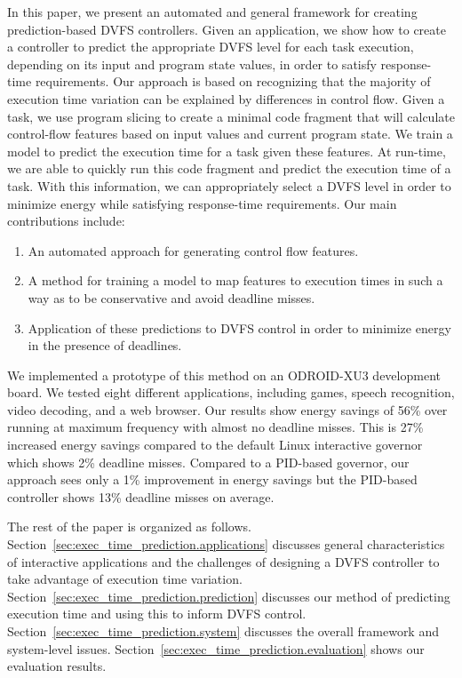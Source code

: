 In this paper, we present an automated and general framework for creating
prediction-based DVFS controllers. Given an application, we show how to create
a controller to predict the appropriate DVFS level for each task execution,
depending on its input and program state values, in order to satisfy
response-time requirements. Our approach is based on recognizing that the
majority of execution time variation can be explained by differences in control
flow.  Given a task, we use program slicing to create a minimal code fragment
that will calculate control-flow features based on input values and current
program state. We train a model to predict the execution time for a task given
these features. At run-time, we are able to quickly run this code fragment and
predict the execution time of a task. With this information, we can
appropriately select a DVFS level in order to minimize energy while satisfying
response-time requirements.  Our main contributions include:
\begin{enumerate}
  \item An automated approach for generating control flow features.
  \item A method for training a model to map features to execution times in
  such a way as to be conservative and avoid deadline misses.
  \item Application of these predictions to DVFS control in order to minimize
  energy in the presence of deadlines.
\end{enumerate}

We implemented a prototype of this method on an ODROID-XU3 development board.
We tested eight different applications, including games, speech recognition,
video decoding, and a web browser. Our results show energy savings of 56\% over
running at maximum frequency with almost no deadline misses. This is 27\%
increased energy savings compared to the default Linux interactive governor
which shows 2\% deadline misses.  Compared to a PID-based governor, our
approach sees only a 1\% improvement in energy savings but the PID-based
controller shows 13\% deadline misses on average.

The rest of the paper is organized as follows.
Section~\ref{sec:exec_time_prediction.applications} discusses general
characteristics of interactive applications and the challenges of designing a
DVFS controller to take advantage of execution time variation.
Section~\ref{sec:exec_time_prediction.prediction} discusses our method of
predicting execution time and using this to inform DVFS control.
Section~\ref{sec:exec_time_prediction.system} discusses the overall framework
and system-level issues. Section~\ref{sec:exec_time_prediction.evaluation}
shows our evaluation results. 

